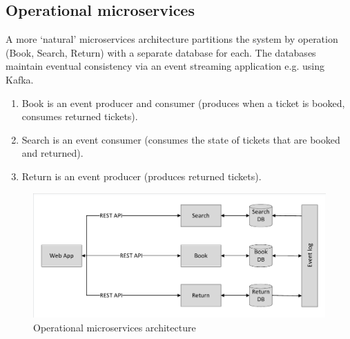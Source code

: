 \begin{shaded}
%
%
\subsection{Operational microservices}

A more `natural' microservices architecture partitions the system by operation (Book, Search, Return) with a separate database for each.  The databases maintain eventual consistency via an event streaming application e.g. using Kafka.
\begin{enumerate}
\item Book is an event producer and consumer (produces when a ticket is booked, consumes returned tickets).
\item Search is an event consumer (consumes the state of tickets that are booked and returned).
\item Return is an event producer (produces returned tickets).
\end{enumerate}

\end{shaded}

\begin{figure}
	\caption{Operational microservices architecture}
	\centering
	\includegraphics[trim = 5 5 5 5, clip, width=\textwidth]{img/operationmicro}
\end{figure}
